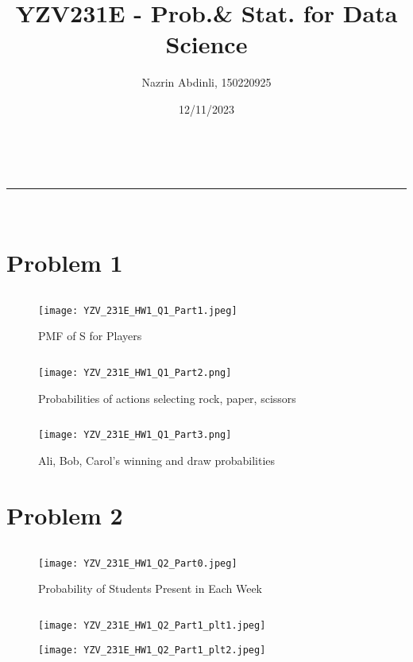 \documentclass[a4paper,11pt]{article}
\makeatletter
\newcommand{\linia}{\rule{\linewidth}{0.5pt}}
\theoremstyle{mytheor}
\renewcommand{\maketitle}{
\begin{center}
\vspace{2ex}
{\huge \textsc{\@title}}
\vspace{1ex}
\\
\linia\\
\@author \hfill \@date
\vspace{4ex}
\end{center}
}
\makeatother
\begin{document}
\title{YZV231E - Prob.& Stat. for Data Science}

\author{Nazrin Abdinli, 150220925}

\date{12/11/2023}

\maketitle

\section*{Problem 1}


\inputminted[breaklines]{python}{script_Q1_part1.py}

\begin{figure}[H]
    \centering
    \texttt{[image: YZV\_231E\_HW1\_Q1\_Part1.jpeg]}
    \caption{PMF of S for Players}
    \label{fig:PMF_S_Players}
\end{figure}

\newpage
\inputminted[breaklines]{python}{script_Q1_part2.py}

\begin{figure}[H]
    \centering
    \texttt{[image: YZV\_231E\_HW1\_Q1\_Part2.png]}
    \caption{Probabilities of actions selecting rock, paper, scissors}
    \label{fig:Prob_action_rps}
\end{figure}


\newpage
\inputminted[breaklines]{python}{script_Q1_part3.py}


\begin{figure}[H]
    \centering
    \texttt{[image: YZV\_231E\_HW1\_Q1\_Part3.png]}
    \caption{Ali, Bob, Carol's winning and draw probabilities}
    \label{fig:Prob_win_AliBobCarol}
\end{figure}

\newpage
\section*{Problem 2}
\inputminted[breaklines]{python}{script_Q2_part0.py}

\begin{figure}[H]
    \centering
    \texttt{[image: YZV\_231E\_HW1\_Q2\_Part0.jpeg]}
    \caption{Probability of Students Present in Each Week}
    \label{fig:ProbStudEachWeek}
\end{figure}

\newpage
\inputminted[breaklines]{python}{script_Q2_part1.py}
\begin{figure}[H]
    \centering
    \texttt{[image: YZV\_231E\_HW1\_Q2\_Part1\_plt1.jpeg]}
    \label{fig:PMF_Stud_present}
\end{figure}
\begin{figure}[H]
    \centering
    \texttt{[image: YZV\_231E\_HW1\_Q2\_Part1\_plt2.jpeg]}
    \label{fig:CDF_Stud_present}
\end{figure}
\end{document}
